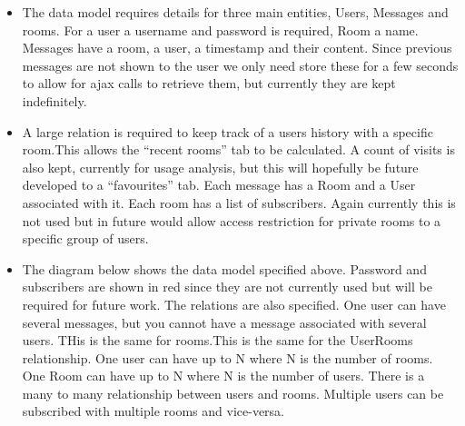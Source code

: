 \documentclass{sig-alt-release2}
\begin{document}
\begin{itemize}
\item The data model requires details for three main entities, Users, Messages and rooms. For a user a username and password is required, Room a name. Messages have a room, a user,  a timestamp and their content.
Since previous messages are not shown to the user we only need store these for a few seconds to allow for ajax calls to retrieve them, but currently they are kept indefinitely.
\item A large relation is required to keep track of a users history with a specific room.This allows the “recent rooms” tab to be calculated. A count of visits is also kept, currently for usage analysis, but this will hopefully be future developed to a “favourites” tab.
Each message has a Room and a User associated with it. Each room has a list of subscribers. Again currently this is not used but in future would allow access restriction for private rooms to a specific group of users.
\item The diagram below shows the data model specified above. Password and subscribers are shown in red since they are not currently used but will be required for future work.
The relations are also specified. One user can have several messages, but you cannot have a message associated with several users. THis is the same for rooms.This is the same for the UserRooms relationship. One user can have up to N where N is the number of rooms. One Room can have up to N where N is the number of users.
There is a many to many relationship between users and rooms. Multiple users can be subscribed with multiple rooms and vice-versa.
\end{itemize}
\end{document}
